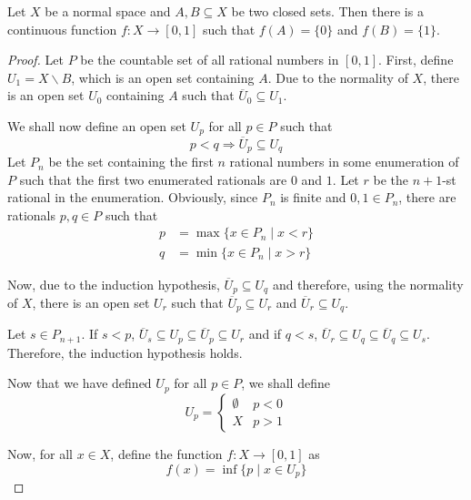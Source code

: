 \begin{definition}
    Let $X$ be a normal space and $A,B\subseteq X$ be two closed sets. Then there is a continuous function $f:X\to[0,1]$ such that $f(A) = \{0\}$ and $f(B) = \{1\}$.
\end{definition}
\begin{proof}
    Let $P$ be the countable set of all rational numbers in $[0,1]$. First, define $U_1 = X\backslash B$, which is an open set containing $A$. Due to the normality of $X$, there is an open set $U_0$ containing $A$ such that $\overline{U}_0\subseteq U_1$.

    We shall now define an open set $U_p$ for all $p\in P$ such that 
    \begin{equation*}
        p < q \Longrightarrow\overline{U}_p\subseteq U_q
    \end{equation*}
    Let $P_n$ be the set containing the first $n$ rational numbers in some enumeration of $P$ such that the first two enumerated rationals are $0$ and $1$. Let $r$ be the $n + 1$-st rational in the enumeration. Obviously, since $P_n$ is finite and $0,1\in P_n$, there are rationals $p,q\in P$ such that 
    \begin{align*}
        p &= \max\{x\in P_n\mid x < r\}\\
        q &= \min\{x\in P_n\mid x > r\}
    \end{align*}

    Now, due to the induction hypothesis, $\overline{U}_p\subseteq U_q$ and therefore, using the normality of $X$, there is an open set $U_r$ such that $\overline{U}_p\subseteq U_r$ and $\overline{U}_r\subseteq U_q$.

    Let $s\in P_{n + 1}$. If $ s < p$, $\overline{U}_s\subseteq U_p\subseteq\overline{U}_p\subseteq U_r$ and if $q < s$, $\overline{U}_r\subseteq U_q\subseteq\overline{U}_q\subseteq U_s$. Therefore, the induction hypothesis holds.


    Now that we have defined $U_p$ for all $p\in P$, we shall define
    \begin{equation*}
        U_p = 
        \begin{cases}
            \emptyset & p < 0\\
            X & p > 1
        \end{cases}
    \end{equation*}

    Now, for all $x\in X$, define the function $f:X\to[0,1]$ as
    \begin{equation*}
        f(x) = \inf\{p\mid x\in U_p\}
    \end{equation*}


\end{proof}
